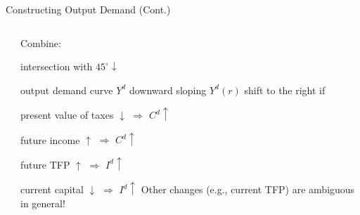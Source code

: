 \documentclass[11pt,aspectratio=169,usenames,dvipsnames]{beamer}
\let\tempa\enumerate
\let\tempb\endenumerate
\renewenvironment{enumerate}{\tempa\addtolength{\itemsep}{\fill}}{\tempb}
\begin{document}
\begin{frame}{Constructing Output Demand (Cont.)}
\begin{columns}
\begin{column}{0.5\textwidth}
\begin{tikzpicture}[domain=0:5]
            \end{tikzpicture}

        \end{column}
        \begin{column}{0.5\textwidth}
            Combine:
            \begin{enumerate}
                \item intersection with $ 45^{\circ} \downarrow $
                \item \alert{output demand curve} $ Y^{d} $ downward sloping
            \end{enumerate}
            $ Y^{d}( r ) $ shift to the right if
            \begin{enumerate}
                \item present value of taxes $ \downarrow  $ $ \Rightarrow  $ $ C^{d} \uparrow  $
                \item future income $ \uparrow  $ $ \Rightarrow  $ $ C^{d} \uparrow  $
                \item future TFP $ \uparrow  $ $ \Rightarrow  $ $ I^{d} \uparrow $
                \item current capital $ \downarrow  $ $ \Rightarrow  $ $ I^{d} \uparrow  $
            \end{enumerate}
            Other changes (e.g., current TFP) are ambiguous in general!
        \end{column}
    \end{columns}
\end{frame}
\end{document}
